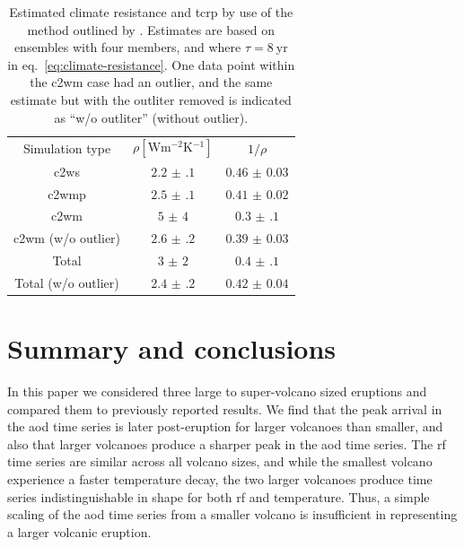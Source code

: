 \documentclass{ametsocV6.1}
\begin{document}
\begin{table}
  \centering

  \caption{Estimated climate resistance and \gls{tcrp} by use of the method outlined by
    \citet{merlis2014}. Estimates are based on ensembles with four members, and where \(\tau
    =\SI{8}{\mathrm{yr}}\) in eq.~\ref{eq:climate-resistance}. One data point within the
    \gls{c2wm} case had an outlier, and the same estimate but with the outliter removed is
    indicated as ``w/o outliter'' (without outlier).}\label{tab:trcp}%
  \begin{tabular}{ccc}
    Simulation type          & \(\rho [\si{\watt\metre^{-2}\kelvin^{-1}}]\) & \(1/\rho\)        \\
    \gls{c2ws}               & \(\num{2.2(1)}\)                             & \(\num{0.46(3)}\) \\
    \gls{c2wmp}              & \(\num{2.5(1)}\)                             & \(\num{0.41(2)}\) \\
    \gls{c2wm}               & \(\num{5(4)}\)                               & \(\num{0.3(1)}\)  \\
    \gls{c2wm} (w/o outlier) & \(\num{2.6(2)}\)                             & \(\num{0.39(3)}\) \\
    Total                    & \(\num{3(2)}\)                               & \(\num{0.4(1)}\)  \\
    Total (w/o outlier)      & \(\num{2.4(2)}\)                             & \(\num{0.42(4)}\) \\
  \end{tabular}
\end{table}


\section{Summary and conclusions}\label{sec:conclusions}

In this paper we considered three large to super-volcano sized eruptions and compared
them to previously reported results. We find that the peak arrival in the \gls{aod} time
series is later post-eruption for larger volcanoes than smaller, and also that larger
volcanoes produce a sharper peak in the \gls{aod} time series. The \gls{rf} time series
are similar across all volcano sizes, and while the smallest volcano experience a faster
temperature decay, the two larger volcanoes produce time series indistinguishable in
shape for both \gls{rf} and temperature. Thus, a simple scaling of the \gls{aod} time
series from a smaller volcano is insufficient in representing a larger volcanic
eruption.
\end{document}
